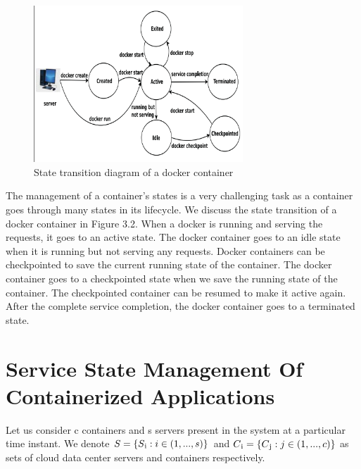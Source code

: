 \begin{figure}[htbp]
\centerline{\includegraphics[width=0.7\textwidth]{fig2}}
\caption{ State transition diagram of a docker container}
\label{fig}
\end{figure}
The management of a container’s states is a very challenging
task as a container goes through many states in its lifecycle. We discuss the state transition of a docker container in
Figure 3.2. When a docker is running and serving the requests,
it goes to an active state. The docker container goes to an
idle state when it is running but not serving any requests.
Docker containers can be checkpointed to save the current
running state of the container. The docker container goes to
a checkpointed state when we save the running state of the
container. The checkpointed container can be resumed to make
it active again. After the complete service completion, the
docker container goes to a terminated state.

\section{Service State Management Of Containerized Applications}
Let us consider c containers and s servers present in the
system at a particular time instant. We denote \begin{math} S = \{ S\textsubscript{i} :   i \in (1,...,s) \} \end{math} and \begin{math} C\textsubscript{i} = \{C\textsubscript{j} : j \in (1,...,c)\}\end{math} as sets of cloud
data center servers and containers respectively.
